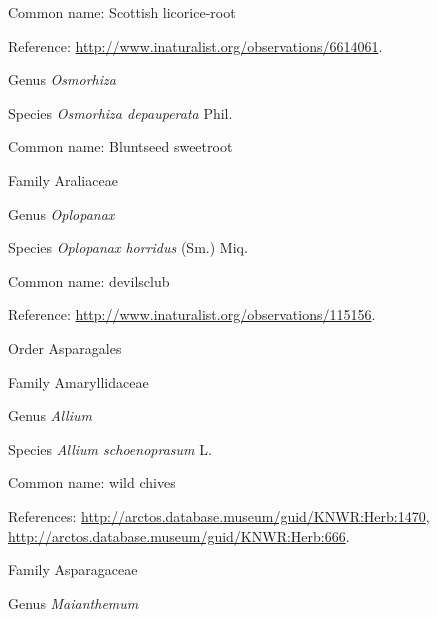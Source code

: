 \documentclass[9pt, article]{memoir}
\begin{document}
\begin{multicols}{2}
Common name: Scottish licorice-root

Reference: 
\url{http://www.inaturalist.org/observations/6614061}.

\vspace{6pt}\noindent\hspace{30pt}Genus \textit{Osmorhiza}


\vspace{6pt}\noindent\hspace{36pt}Species \textit{Osmorhiza depauperata} Phil.


Common name: Bluntseed sweetroot

\vspace{6pt}\noindent\hspace{24pt}Family Araliaceae


\vspace{6pt}\noindent\hspace{30pt}Genus \textit{Oplopanax}


\vspace{6pt}\noindent\hspace{36pt}Species \textit{Oplopanax horridus} (Sm.) Miq.


Common name: devilsclub

Reference: 
\url{http://www.inaturalist.org/observations/115156}.

\vspace{6pt}\noindent\hspace{18pt}Order Asparagales


\vspace{6pt}\noindent\hspace{24pt}Family Amaryllidaceae


\vspace{6pt}\noindent\hspace{30pt}Genus \textit{Allium}


\vspace{6pt}\noindent\hspace{36pt}Species \textit{Allium schoenoprasum} L.


Common name: wild chives

References: 
\url{http://arctos.database.museum/guid/KNWR:Herb:1470}, 
\url{http://arctos.database.museum/guid/KNWR:Herb:666}.

\vspace{6pt}\noindent\hspace{24pt}Family Asparagaceae


\vspace{6pt}\noindent\hspace{30pt}Genus \textit{Maianthemum}



\end{multicols}
\end{document}
